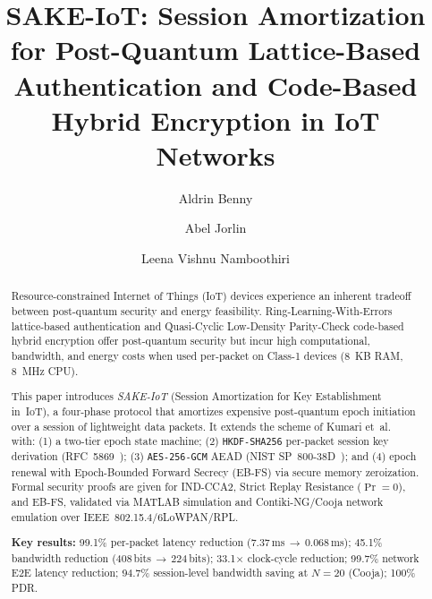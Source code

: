 \documentclass[runningheads]{llncs}
\newcommand{\GCM}{\texttt{AES-256-GCM}}
\newcommand{\HKDF}{\texttt{HKDF-SHA256}}
\begin{document}
\title{SAKE-IoT: Session Amortization for Post-Quantum Lattice-Based
Authentication and Code-Based Hybrid Encryption in IoT Networks}


\author{Aldrin Benny \and
Abel Jorlin \and
Leena Vishnu Namboothiri}



\maketitle

\begin{abstract}
Resource-constrained Internet of Things (IoT) devices experience an inherent
tradeoff between post-quantum security and energy feasibility. Ring-Learning-With-Errors
lattice-based authentication and Quasi-Cyclic Low-Density Parity-Check
code-based hybrid encryption offer post-quantum security but incur high
computational, bandwidth, and energy costs when used per-packet on Class-1
devices (8~KB RAM, 8~MHz CPU).

This paper introduces \emph{SAKE-IoT} (Session Amortization for Key
Establishment in~IoT), a four-phase protocol that amortizes expensive
post-quantum epoch initiation over a session of lightweight data packets.
It extends the scheme of Kumari et~al.~\cite{kumari2022} with: (1) a
two-tier epoch state machine; (2) \HKDF{} per-packet session key derivation
(RFC~5869~\cite{rfc5869}); (3) \GCM{} AEAD (NIST SP~800-38D~\cite{nist38d});
and (4) epoch renewal with Epoch-Bounded Forward Secrecy (EB-FS) via secure
memory zeroization. Formal security proofs are given for IND-CCA2, Strict
Replay Resistance ($\Pr=0$), and EB-FS, validated via MATLAB simulation
and Contiki-NG/Cooja network emulation over IEEE~802.15.4/6LoWPAN/RPL.

\noindent\textbf{Key results:} 99.1\% per-packet latency reduction
(7.37\,ms\,$\to$\,0.068\,ms); 45.1\% bandwidth reduction
(408\,bits\,$\to$\,224\,bits); 33.1$\times$ clock-cycle reduction;
99.7\% network E2E latency reduction; 94.7\% session-level bandwidth
saving at $N{=}20$ (Cooja); 100\% PDR.

\end{abstract}
\end{document}
